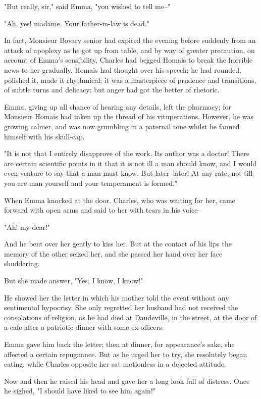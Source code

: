 \documentclass[11pt,twocolumn]{ltugboat}
\begin{document}
"But really, sir," said Emma, "you wished to tell me--"

"Ah, yes! madame. Your father-in-law is dead."

In fact, Monsieur Bovary senior had expired the evening before suddenly
from an attack of apoplexy as he got up from table, and by way of
greater precaution, on account of Emma's sensibility, Charles had begged
Homais to break the horrible news to her gradually. Homais had thought
over his speech; he had rounded, polished it, made it rhythmical; it was
a masterpiece of prudence and transitions, of subtle turns and delicacy;
but anger had got the better of rhetoric.

Emma, giving up all chance of hearing any details, left the pharmacy;
for Monsieur Homais had taken up the thread of his vituperations.
However, he was growing calmer, and was now grumbling in a paternal tone
whilst he fanned himself with his skull-cap.

"It is not that I entirely disapprove of the work. Its author was a
doctor! There are certain scientific points in it that it is not ill a
man should know, and I would even venture to say that a man must know.
But later--later! At any rate, not till you are man yourself and your
temperament is formed."

When Emma knocked at the door. Charles, who was waiting for her, came
forward with open arms and said to her with tears in his voice--

"Ah! my dear!"

And he bent over her gently to kiss her. But at the contact of his lips
the memory of the other seized her, and she passed her hand over her
face shuddering.

But she made answer, "Yes, I know, I know!"

He showed her the letter in which his mother told the event without any
sentimental hypocrisy. She only regretted her husband had not received
the consolations of religion, as he had died at Daudeville, in the
street, at the door of a cafe after a patriotic dinner with some
ex-officers.

Emma gave him back the letter; then at dinner, for appearance's sake,
she affected a certain repugnance. But as he urged her to try, she
resolutely began eating, while Charles opposite her sat motionless in a
dejected attitude.

Now and then he raised his head and gave her a long look full of
distress. Once he sighed, "I should have liked to see him again!"
\end{document}
